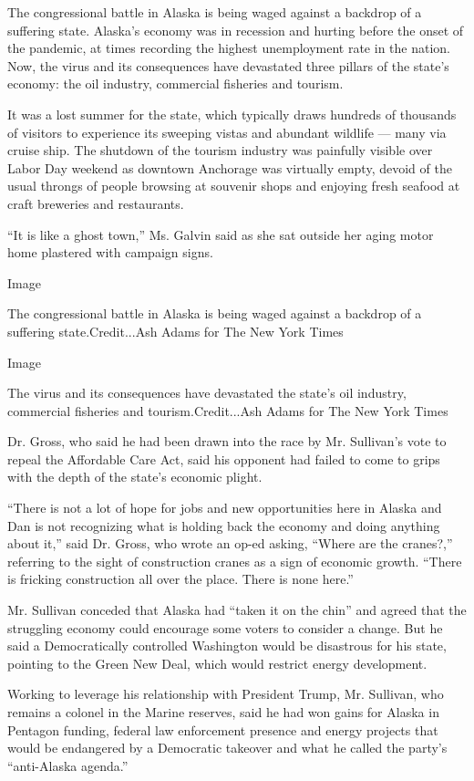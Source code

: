The congressional battle in Alaska is being waged against a backdrop of
a suffering state. Alaska's economy was in recession and hurting before
the onset of the pandemic, at times recording the highest unemployment
rate in the nation. Now, the virus and its consequences have devastated
three pillars of the state's economy: the oil industry, commercial
fisheries and tourism.

It was a lost summer for the state, which typically draws hundreds of
thousands of visitors to experience its sweeping vistas and abundant
wildlife --- many via cruise ship. The shutdown of the tourism industry
was painfully visible over Labor Day weekend as downtown Anchorage was
virtually empty, devoid of the usual throngs of people browsing at
souvenir shops and enjoying fresh seafood at craft breweries and
restaurants.

``It is like a ghost town,'' Ms. Galvin said as she sat outside her
aging motor home plastered with campaign signs.

Image

The congressional battle in Alaska is being waged against a backdrop of
a suffering state.Credit...Ash Adams for The New York Times

Image

The virus and its consequences have devastated the state's oil industry,
commercial fisheries and tourism.Credit...Ash Adams for The New York
Times

Dr. Gross, who said he had been drawn into the race by Mr. Sullivan's
vote to repeal the Affordable Care Act, said his opponent had failed to
come to grips with the depth of the state's economic plight.

``There is not a lot of hope for jobs and new opportunities here in
Alaska and Dan is not recognizing what is holding back the economy and
doing anything about it,'' said Dr. Gross, who wrote an op-ed asking,
``Where are the cranes?,'' referring to the sight of construction cranes
as a sign of economic growth. ``There is fricking construction all over
the place. There is none here.''

Mr. Sullivan conceded that Alaska had ``taken it on the chin'' and
agreed that the struggling economy could encourage some voters to
consider a change. But he said a Democratically controlled Washington
would be disastrous for his state, pointing to the Green New Deal, which
would restrict energy development.

Working to leverage his relationship with President Trump, Mr. Sullivan,
who remains a colonel in the Marine reserves, said he had won gains for
Alaska in Pentagon funding, federal law enforcement presence and energy
projects that would be endangered by a Democratic takeover and what he
called the party's ``anti-Alaska agenda.''


